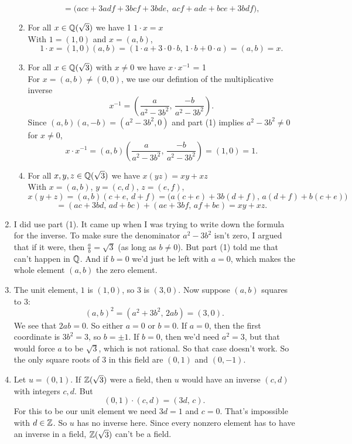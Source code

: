 \documentclass{report}
\begin{document}
\begin{proofWithHibiscus}
\begin{enumerate}
\begin{enumerate}
\[              =\big(ace+3adf+3bcf+3bde,\; acf+ade+bce+3bdf\big),
        \]
      \item For all $x \in \mathbb{Q}(\sqrt{3})$ we have 1 $1\cdot x = x$ \\
      With $1=(1,0)$ and $x=(a,b)$,
        \[
          1\cdot x=(1,0)(a,b)=(1\cdot a+3\cdot 0\cdot b,\,1\cdot b+0\cdot a)=(a,b)=x.
        \]
      \item For all $x \in \mathbb{Q}(\sqrt{3})$ with $x \neq 0$ we have $x \cdot x^{-1}$ = 1 \\
        For $x=(a,b)\neq(0,0)$, we use our defintion of the multiplicative inverse 
        \[
          x^{-1}=\left(\frac{a}{a^2-3b^2},\,\frac{-b}{a^2-3b^2}\right).
        \]
        Since $(a,b)(a,-b)=(a^2-3b^2,0)$ and part (1) implies $a^2-3b^2\neq 0$ for $x\neq 0$,
        \[
          x\cdot x^{-1}
          =(a,b)\left(\frac{a}{a^2-3b^2},\,\frac{-b}{a^2-3b^2}\right)
          =(1,0)=1.
        \]
      \item For all $x,y,z \in \mathbb{Q}(\sqrt{3})$ we have $x(yz) = xy + xz$ \\
        With $x=(a,b)$, $y=(c,d)$, $z=(e,f)$,
        \[
          x(y+z)=(a,b)(c+e,\,d+f)
                =\big(a(c+e)+3b(d+f),\, a(d+f)+b(c+e)\big)
        \]
        \[
                =(ac+3bd,\,ad+bc)+(ae+3bf,\,af+be)=xy+xz.
        \]
    \end{enumerate}
    \item I did use part (1). It came up when I was trying to write down the formula for the inverse.  
    To make sure the denominator $a^2 - 3b^2$ isn't zero, I argued that if it were, then $\frac{a}{b} = \sqrt{3}$ (as long as $b\neq 0$). But part (1) told me that can’t happen in $\mathbb{Q}$. And if $b=0$ we'd just be left with $a=0$, which makes the whole element $(a,b)$ the zero element. 

    \item The unit element, $1$ is $(1,0)$, so $3$ is $(3,0)$. Now suppose $(a,b)$ squares to $3$:  
    \[
      (a,b)^2 = (a^2+3b^2,\, 2ab) = (3,0).
    \]  
    We see that $2ab=0$. So either $a=0$ or $b=0$. If $a=0$, then the first coordinate is $3b^2 = 3$, so $b=\pm 1$. If $b=0$, then we'd need $a^2 = 3$, but that would force $a$ to be $\sqrt{3}$, which is not rational. So that case doesn't work.  So the only square roots of $3$ in this field are $(0,1)$ and $(0,-1)$.

    \item Let $u=(0,1)$. If $\mathbb{Z}(\sqrt{3})$ were a field, then $u$ would have an inverse $(c,d)$ with integers $c,d$. But  
    \[
      (0,1)\cdot(c,d) = (3d,\,c).
    \]  
    For this to be our unit element we need $3d=1$ and $c=0$. That’s impossible with $d\in\mathbb{Z}$. So $u$ has no inverse here. Since every nonzero element has to have an inverse in a field, $\mathbb{Z}(\sqrt{3})$ can't be a field.
  \end{enumerate}
  

\end{proofWithHibiscus}
\end{document}
